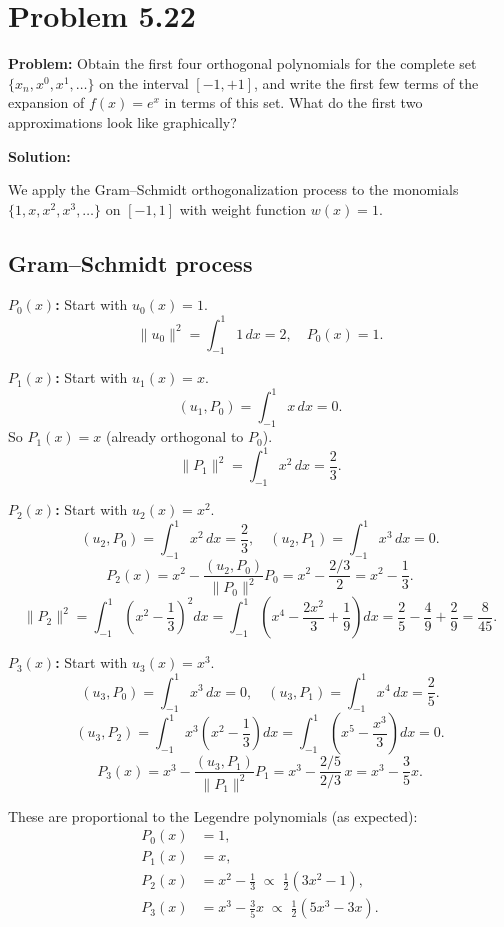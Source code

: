 \documentclass[12pt]{article}
\begin{document}
\section*{Problem 5.22}

\textbf{Problem:} Obtain the first four orthogonal polynomials for the complete set $\{x_n, x^0, x^1, \ldots\}$ on the interval $[-1,+1]$, and write the first few terms of the expansion of $f(x) = e^x$ in terms of this set. What do the first two approximations look like graphically?

\bigskip
\textbf{Solution:}

We apply the Gram--Schmidt orthogonalization process to the monomials $\{1, x, x^2, x^3, \ldots\}$ on $[-1,1]$ with weight function $w(x) = 1$.

\subsection*{Gram--Schmidt process}

\textbf{$P_0(x)$:} Start with $u_0(x) = 1$.
\[
\|u_0\|^2 = \int_{-1}^{1}1\,dx = 2, \quad P_0(x) = 1.
\]

\textbf{$P_1(x)$:} Start with $u_1(x) = x$.
\[
(u_1, P_0) = \int_{-1}^{1}x\,dx = 0.
\]
So $P_1(x) = x$ (already orthogonal to $P_0$).
\[
\|P_1\|^2 = \int_{-1}^{1}x^2\,dx = \frac{2}{3}.
\]

\textbf{$P_2(x)$:} Start with $u_2(x) = x^2$.
\[
(u_2, P_0) = \int_{-1}^{1}x^2\,dx = \frac{2}{3}, \quad (u_2, P_1) = \int_{-1}^{1}x^3\,dx = 0.
\]
\[
P_2(x) = x^2 - \frac{(u_2,P_0)}{\|P_0\|^2}P_0 = x^2 - \frac{2/3}{2} = x^2 - \frac{1}{3}.
\]
\[
\|P_2\|^2 = \int_{-1}^{1}\left(x^2-\frac{1}{3}\right)^2 dx = \int_{-1}^{1}\left(x^4 - \frac{2x^2}{3} + \frac{1}{9}\right)dx = \frac{2}{5} - \frac{4}{9} + \frac{2}{9} = \frac{8}{45}.
\]

\textbf{$P_3(x)$:} Start with $u_3(x) = x^3$.
\[
(u_3, P_0) = \int_{-1}^{1}x^3\,dx = 0, \quad (u_3, P_1) = \int_{-1}^{1}x^4\,dx = \frac{2}{5}.
\]
\[
(u_3, P_2) = \int_{-1}^{1}x^3\left(x^2-\frac{1}{3}\right)dx = \int_{-1}^{1}\left(x^5 - \frac{x^3}{3}\right)dx = 0.
\]
\[
P_3(x) = x^3 - \frac{(u_3,P_1)}{\|P_1\|^2}P_1 = x^3 - \frac{2/5}{2/3}\,x = x^3 - \frac{3}{5}x.
\]

These are proportional to the Legendre polynomials (as expected):
\begin{align}
P_0(x) &= 1, \\
P_1(x) &= x, \\
P_2(x) &= x^2 - \tfrac{1}{3} \;\propto\; \tfrac{1}{2}(3x^2-1), \\
P_3(x) &= x^3 - \tfrac{3}{5}x \;\propto\; \tfrac{1}{2}(5x^3-3x).
\end{align}
\end{document}
